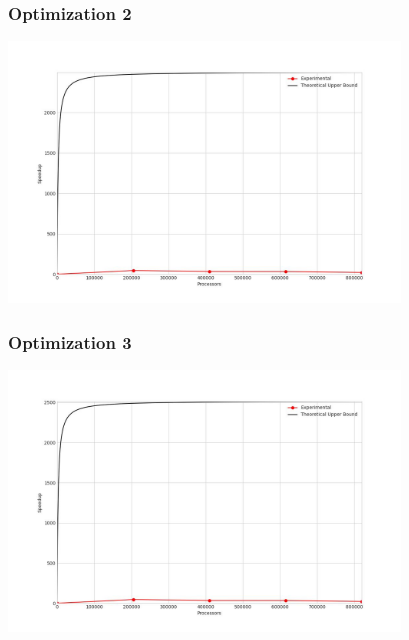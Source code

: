 \subsubsection{Optimization 2}
\begin{center}
    \resizebox{0.8\textwidth}{!}{}
    \includegraphics[width=0.78\textwidth]{../img/speedup-graph_type-tile-820000-O2}
\end{center}

\subsubsection{Optimization 3}
\begin{center}
    \resizebox{0.8\textwidth}{!}{}
    \includegraphics[width=0.78\textwidth]{../img/speedup-graph_type-tile-820000-O3}
\end{center}
